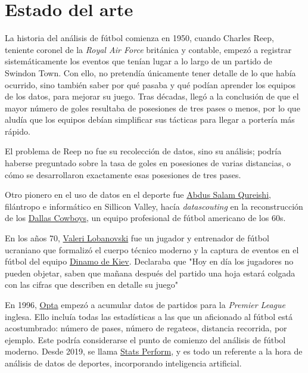 \chapter{Estado del arte}

La historia del análisis de fútbol comienza en 1950, cuando Charles Reep\cite{reep-bio}, teniente coronel de 
la \textit{Royal Air Force} británica y contable, empezó a 
registrar sistemáticamente los eventos que tenían lugar a lo largo de un partido de Swindon Town. Con ello, no pretendía 
únicamente tener detalle de lo que había ocurrido, sino también saber por qué pasaba y qué podían aprender los 
equipos de los datos, para mejorar su juego. Tras décadas, llegó a la conclusión de que el mayor número 
de goles resultaba de posesiones de tres pases o menos, por lo que aludía que los equipos debían simplificar 
sus tácticas para llegar a portería más rápido.

El problema de Reep no fue su recolección de datos, sino su análisis; podría haberse preguntado sobre 
la tasa de goles en posesiones de varias distancias, o cómo se desarrollaron exactamente esas 
posesiones de tres pases. 

Otro pionero en el uso de datos en el deporte fue \href{http://www.riazhaq.com/2022/08/remembering-salam-qureishi-pillar-of.html}{Abdus Salam Qureishi}, 
filántropo e informático en Sillicon Valley, hacía \textit{datascouting} en la reconstrucción de los 
\href{https://www.dallascowboys.com/}{Dallas Cowboys}, un equipo profesional de fútbol americano de los 60s.\cite{chazan2020sports}

En los años 70, \href{https://es.wikipedia.org/wiki/Valeri_Lobanovski}{Valeri Lobanovski} fue un jugador y entrenador de 
fútbol ucraniano que formalizó el cuerpo técnico moderno y la captura de eventos en el fútbol del equipo \href{https://es.wikipedia.org/wiki/F._C._Dinamo_de_Kiev}{Dinamo de 
Kiev}. Declaraba que "Hoy en día los jugadores no pueden objetar, saben que mañana después del partido una hoja estará colgada con 
las cifras que describen en detalle su juego"\cite{kilpatrick2011inverting}

En 1996, \href{https://es.wikipedia.org/wiki/Opta_Sports}{Opta} empezó a acumular datos de partidos para la 
\textit{Premier League} inglesa. Ello incluía todas las estadísticas a las que un aficionado al fútbol está 
acostumbrado: número de pases, número de regateos, distancia recorrida, por ejemplo. Este podría considerarse 
el punto de comienzo del análisis de fútbol moderno. Desde 2019, se llama \href{https://www.statsperform.com/}{Stats Perform}, y 
es todo un referente a la hora de análisis de datos de deportes, incorporando inteligencia artificial.

